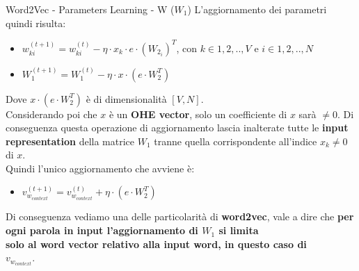 \documentclass[british]{beamer}
\begin{document}
\begin{frame}{Word2Vec - Parameters Learning - W (\(W_1\))}
	L'aggiornamento dei parametri quindi risulta:
	\begin{itemize}
		\item \( w_{ki}^{(t+1)} = w_{ki}^{(t)} - \eta\cdot x_k \cdot e \cdot (W_{2_{i}})^T\), con \(k \in {1,2,..,V}\) e \(i \in {1,2,..,N}\)
		\item \( W_{1}^{(t+1)} = W_{1}^{(t)} - \eta\cdot x \cdot \left( e \cdot W_{2}^T \right) \)
	\end{itemize}
	Dove \(x \cdot \left( e \cdot W_2^T\right)\) \`{e} di dimensionalit\`{a} \([V,N]\).\\
	Considerando poi che \(x\) \`{e} un \textbf{OHE vector}, solo un coefficiente di \(x\) sar\`{a} \(\neq 0\).
	Di conseguenza questa operazione di aggiornamento lascia inalterate tutte le \textbf{input representation} della matrice \textbf{\(W_1\)} tranne quella corrispondente all'indice \(x_k \neq0\) di \(x\). \\
	Quindi l'unico aggiornamento che avviene \`{e}:
	\begin{itemize}
		\item \( v_{w_{context}}^{(t+1)} = v_{w_{context}}^{(t)} + \eta\cdot \left(e \cdot W_{2}^T\right)\)
	\end{itemize}
	Di conseguenza vediamo una delle particolarit\`{a} di \textbf{word2vec}, vale a dire che \textbf{per ogni parola in input l'aggiornamento di \(W_1\) si limita \\solo al word vector relativo alla input word, in questo caso di\\ \(v_{w_{context}}\)}. 
\end{frame}
\end{document}
